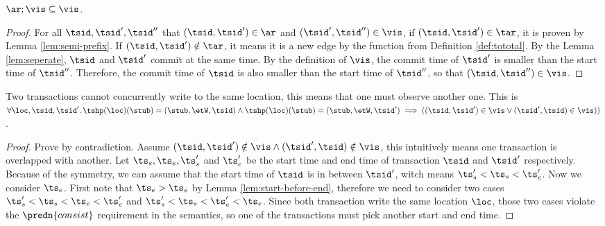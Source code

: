 \begin{lem}[Prefix]
    \label{lem:prefix}
    \( \ar; \vis \subseteq \vis \).
\end{lem}
\begin{proof}
    For all \( \tsid, \tsid', \tsid'' \) that \( (\tsid, \tsid') \in \ar \) and \( (\tsid', \tsid'') \in \vis \), if \( (\tsid, \tsid') \in \tar \), it is proven by Lemma \ref{lem:semi-prefix}.
    If \( ( \tsid, \tsid' ) \notin \tar \), it means it is a new edge by the  function from Definition \ref{def:tototal}.
    By the Lemma \ref{lem:seperate}, \( \tsid \) and \( \tsid' \) commit at the same time.
    By the definition of \( \vis \), the commit time of \( \tsid' \) is smaller than the start time of \( \tsid'' \).
    Therefore, the commit time of \( \tsid \) is also smaller than the start time of \( \tsid'' \), so that \( ( \tsid, \tsid'' ) \in \vis \).
\end{proof}

\begin{lem}[No conflict]
    \label{lem:nocoflict}
    Two transactions cannot concurrently write to the same location, this means that one must observe another one.
    This is \( \forall \loc, \tsid, \tsid' \ldotp \tshp(\loc)(\stub) = (\stub, \etW, \tsid) \land  \tshp(\loc)(\stub) = (\stub, \etW, \tsid' ) \implies ((\tsid, \tsid') \in \vis \lor (\tsid', \tsid) \in \vis ))\).
\end{lem}
\begin{proof}
    Prove by contradiction.
    Assume \( (\tsid, \tsid') \notin \vis \land (\tsid', \tsid) \notin \vis \), this intuitively means one transaction is overlapped with another.
    Let \( \ts_{s}, \ts_{e}, \ts'_{s} \) and \( \ts'_{e} \) be the start time and end time of transaction \( \tsid \) and \( \tsid' \) respectively.
    Because of the symmetry,  we can assume that the start time of \( \tsid \) is in between \( \tsid' \), witch means \( \ts'_{s} < \ts_{s} < \ts'_{e} \).
    Now we consider \( \ts_{e} \).
    First note that \( \ts_{e} > \ts_{s} \) by Lemma \ref{lem:start-before-end}, therefore we need to consider two cases \( \ts'_{s} < \ts_{s} < \ts_{e} < \ts'_{e} \) and  \( \ts'_{s} < \ts_{s} < \ts'_{e} < \ts_{e}  \).
    Since both transaction write the same location \( \loc \), those two cases violate the \( \predn{consist} \) requirement in the semantics, so one of the transactions must pick another start and end time.
\end{proof}


